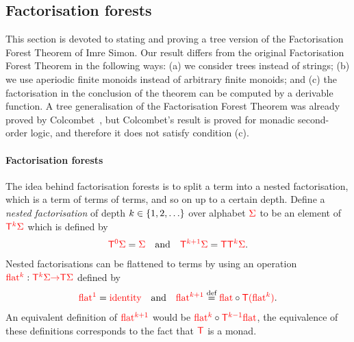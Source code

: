 \subsection{Factorisation forests}
\label{sec:factfor}
This section is devoted to stating and proving a tree version of the Factorisation Forest Theorem of Imre Simon.  Our result differs from the original Factorisation Forest Theorem in the following ways: (a) we consider trees instead of strings; (b) we use aperiodic finite monoids instead of arbitrary finite monoids; and (c) the factorisation in the conclusion of the theorem can be computed by a derivable function.  A tree generalisation of the Factorisation Forest Theorem was already proved by Colcombet~\cite[Theorem 1 and Section 3.3]{colcombetCombinatorialTheoremTrees2007}, but Colcombet's result is proved for monadic second-order logic, and therefore it does not satisfy condition (c). 



\paragraph{Factorisation forests} The idea behind factorisation forests is to split a term into a nested factorisation, which is a term of terms of terms, and so on up to a certain depth.  
Define a \emph{nested factorisation} of depth $k \in \{1,2,\ldots\}$ over alphabet ${\color{red}{\Sigma}}$ to be an element of ${\color{red}{\mathsf T}}^{{\color{red}{k}}} {\color{red}{\Sigma}}$ which is defined by
\begin{align*}
{\color{red}{\mathsf T}}^{{\color{red}{0}}} {\color{red}{\Sigma}} = {\color{red}{\Sigma}}  \quad \text{and} \quad {\color{red}{\mathsf T}}^{{\color{red}{k+1}}}{\color{red}{\Sigma}} = {\color{red}{\mathsf T}} {\color{red}{\mathsf T}}^{{\color{red}{k}}} {\color{red}{\Sigma}}.
\end{align*}
Nested factorisations can be flattened to terms by using an  operation ${\color{red}{\mathrm{flat}}}^{{\color{red}{k}}} : {\color{red}{\mathsf T}}^{{\color{red}{k}}} {\color{red}{\Sigma}} {\color{red}{\to}} {\color{red}{\mathsf T}} {\color{red}{\Sigma}} $ defined by 
\begin{align*}
     {\color{red}{\mathrm{flat}}}^{{\color{red}{1}}} = \text{{\color{red}{identity}}} \quad \text{and} \quad  {\color{red}{\mathrm{flat}}}^{{\color{red}{k+1}}} \stackrel{\text{def}}= {\color{red}{\mathrm{flat}}}  \circ {\color{red}{\mathsf T}} {\color{red}{(}} {\color{red}{\mathrm{flat}}}^{{\color{red}{k}}}{\color{red}{)}}.
\end{align*}
An equivalent definition of ${\color{red}{\mathrm{flat}}}^{{\color{red}{k+1}}}$ would be ${\color{red}{\mathrm{flat}}}^{{\color{red}{k}}} \circ {\color{red}{\mathsf T}}^{{\color{red}{k-1}}} {\color{red}{\mathrm{flat}}}$, the equivalence of these definitions corresponds to the fact that ${\color{red}{\mathsf T}}$ is a monad.


